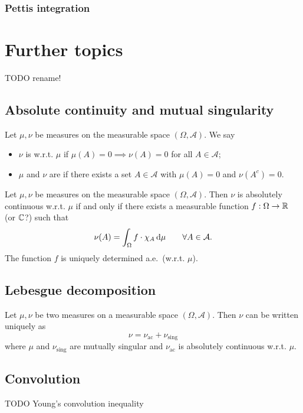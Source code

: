 \subsubsection{Pettis integration}


\section{Further topics}
TODO rename!

\subsection{Absolute continuity and mutual singularity}
\begin{definition}
Let $\mu,\nu$ be measures on the measurable space $(\Omega,\mathcal{A})$. We say
\begin{itemize}
\item $\nu$ is  w.r.t. $\mu$ if $\mu(A)=0\implies \nu(A) = 0$ for all $A\in\mathcal{A}$;
\item $\mu$ and $\nu$ are  if there exists a set $A\in\mathcal{A}$ with $\mu(A) = 0$ and $\nu(A^c) = 0$.
\end{itemize}
\end{definition}

\begin{theorem}
Let $\mu,\nu$ be measures on the measurable space $(\Omega,\mathcal{A})$. Then $\nu$ is absolutely continuous w.r.t. $\mu$ \textup{if and only if} there exists a measurable function $f:\Omega\to\mathbb{R}$ (or $\mathbb{C}$?) such that
\[ \nu(A) = \int_\Omega f\cdot \chi_A \operatorname{d \!}{\mu} \qquad \forall A\in\mathcal{A}. \]
The function $f$ is uniquely determined a.e.\ (w.r.t. $\mu$).
\end{theorem}

\subsection{Lebesgue decomposition}
\begin{theorem}
Let $\mu, \nu$ be two measures on a measurable space $(\Omega, \mathcal{A})$. Then $\nu$ can be written uniquely as
\[ \nu = \nu_\text{ac} + \nu_\text{sing} \]
where $\mu$ and $\nu_\text{sing}$ are mutually singular and $\nu_\text{ac}$ is absolutely continuous w.r.t. $\mu$. 

\end{theorem}

\subsection{Convolution}
TODO Young's convolution inequality

